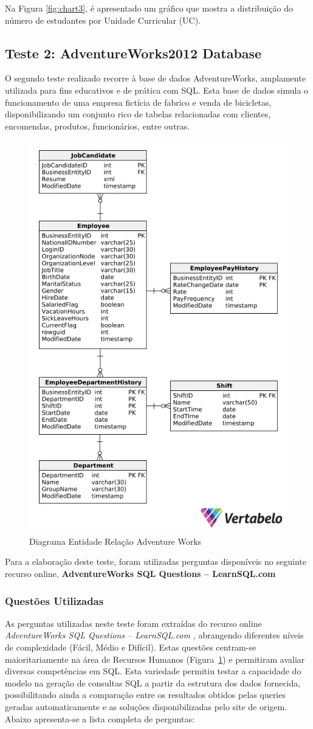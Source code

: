 \documentclass{article}
\begin{document}
Na Figura \ref{fig:chart3}, é apresentado um gráfico que mostra a distribuição do número de estudantes por Unidade Curricular (UC).

\subsection{Teste 2: AdventureWorks2012 Database}

\hspace*{1em} O segundo teste realizado recorre à base de dados AdventureWorks, amplamente utilizada para fins educativos e de prática com SQL. Esta base de dados simula o funcionamento de uma empresa fictícia de fabrico e venda de bicicletas, disponibilizando um conjunto rico de tabelas relacionadas com clientes, encomendas, produtos, funcionários, entre outras.

\begin{figure}[ht]
    \centering
    \includegraphics[width=0.25\linewidth]{AdvDiagram.png}
    \caption{Diagrama Entidade Relação Adventure Works}
    \label{fig:diaAdv}
\end{figure}

Para a elaboração deste teste, foram utilizadas perguntas disponíveis no seguinte recurso online, \textbf{AdventureWorks SQL Questions – LearnSQL.com \cite{learnsql2022}}


\subsubsection{Questões Utilizadas}

\hspace*{1em} As perguntas utilizadas neste teste foram extraídas do recurso online \textit{AdventureWorks SQL Questions – LearnSQL.com \cite{learnsql2022}}, abrangendo diferentes níveis de complexidade (Fácil, Médio e Difícil). Estas questões centram-se maioritariamente na área de Recursos Humanos (Figura~\ref{fig:diaAdv}) e permitiram avaliar diversas competências em SQL. Esta variedade permitiu testar a capacidade do modelo na geração de consultas SQL a partir da estrutura dos dados fornecida, possibilitando ainda a comparação entre os resultados obtidos pelas queries geradas automaticamente e as soluções disponibilizadas pelo site de origem. Abaixo apresenta-se a lista completa de perguntas:
\end{document}
